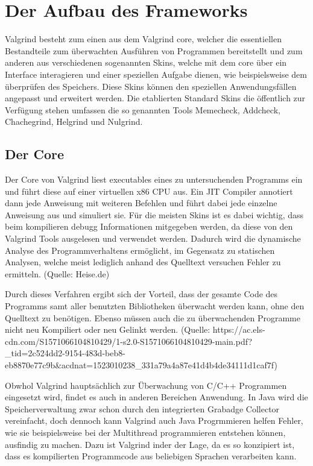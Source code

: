 \section{Der Aufbau des Frameworks}
Valgrind besteht zum einen aus dem Valgrind core, welcher die essentiellen Bestandteile zum überwachten Ausführen von Programmen bereitstellt und zum anderen aus verschiedenen sogenannten Skins, welche mit dem core über ein Interface interagieren und einer speziellen Aufgabe dienen, wie beispielsweise dem überprüfen des Speichers. Diese Skins können den speziellen Anwendungsfällen angepasst und erweitert werden. Die etablierten Standard Skins die öffentlich zur Verfügung stehen umfassen die so genannten Tools Memecheck, Addcheck, Chachegrind, Helgrind und Nulgrind.

\subsection{Der Core}
Der Core von Valgrind liest executables eines zu untersuchenden Programms ein und führt diese auf einer virtuellen x86 CPU aus. Ein JIT Compiler annotiert dann jede Anweisung mit weiteren Befehlen und führt dabei jede einzelne Anweisung aus und simuliert sie. Für die meisten Skins ist es dabei wichtig, dass beim kompilieren debugg Informationen mitgegeben werden, da diese von den Valgrind Tools ausgelesen und verwendet werden. Dadurch wird die dynamische Analyse des Programmverhaltens ermöglicht, im Gegensatz zu statischen Analysen, welche meist lediglich anhand des Quelltext versuchen Fehler zu ermitteln. (Quelle: Heise.de)

Durch dieses Verfahren ergibt sich der Vorteil, dass der gesamte Code des Programms samt aller benutzten Bibliotheken überwacht werden kann, ohne den Quelltext zu benötigen.
Ebenso müssen auch die zu überwachenden Programme nicht neu Kompiliert oder neu Gelinkt werden.
(Quelle: https://ac.els-cdn.com/S1571066104810429/1-s2.0-S1571066104810429-main.pdf?_tid=2c524dd2-9154-483d-beb8-eb8870e77c9b&acdnat=1523010238_331a79a4a87e41d4b4de34111d1caf7f)

Obwhol Valgrind hauptsächlich zur Überwachung von C/C++ Programmen eingesetzt wird, findet es auch in anderen Bereichen Anwendung. In Java wird die Speicherverwaltung zwar schon durch den integrierten Grabadge Collector vereinfacht, doch dennoch kann Valgrind auch Java Progrmmieren helfen Fehler, wie sie beispielsweise bei der Multithread programmieren entstehen können, ausfindig zu machen. Dazu ist Valgrind inder der Lage, da es so konzipiert ist, dass es kompilierten Programmcode aus beliebigen Sprachen verarbeiten kann.